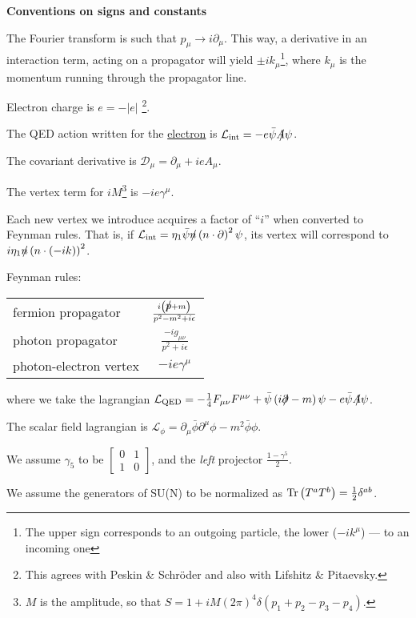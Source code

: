 \documentclass[14pt]{article}
\newcommand{\slashed}[1]{\hbox{{$#1$}\llap{$/$}}}
\begin{document}
\renewcommand{\thefootnote}{\fnsymbol{footnote}}

\begin{center}
	{\Large\bf Conventions on signs and constants}
\end{center}

\bigskip

	The Fourier transform is such that
$ p_\mu \to i \partial_\mu $. 
	This way, a derivative in an
	interaction term, acting on a propagator will yield
$ \pm i k_\mu $\footnote[2]{The upper sign corresponds to an outgoing
particle, the lower ($ - i k^\mu $) --- to an incoming one},
	where
$ k_\mu $
	is the momentum running through the propagator line.

	Electron charge is 
$ e = - |e| $ \footnote[3]{This agrees with Peskin \& Schr\"oder and also
with Lifshitz \& Pitaevsky.}.

	The QED action written for the \underline{electron} is
$ \mathcal{L}_{\rm int} = -e\bar{\psi}\slashed{A}\psi $.

	The covariant derivative is 
$ \mathcal{D}_\mu = \partial_\mu + i e A_\mu $.

	The vertex term for 
$ i M $\footnote[8]{ 
$ M $ is the amplitude, so that 
$ S = 1 + i M (2\pi)^4 \delta \left(p_1 + p_2 - p_3 - p_4\right) $.}
	is 
$ - i e \gamma^\mu $.

	Each new vertex we introduce acquires a factor of 
``$ i $''
	when converted to Feynman rules. That is, if
$ \mathcal{L}_{\rm int} = \eta_1 \bar\psi \slashed{n} 
	\left(n\cdot\partial\right)^2 \psi $,
	its vertex will correspond to
$ i\eta_1 \slashed{n} \left ( n \cdot (-i k)\right)^2 $.

\bigskip
	Feynman rules:
\renewcommand{\arraystretch}{2.3}
\begin{tabular}{lc}
	fermion propagator &
$ \frac{i\left(\slashed{p} + m \right)}{p^2 - m^2 + i\epsilon} $ \\

	photon propagator &
$ \frac{-i g_{\mu\nu}}{p^2 + i\epsilon} $ \\

	photon-electron vertex & 
$ -i e \gamma^\mu $ \\
\end{tabular}

\bigskip
	where we take the lagrangian
$ \mathcal{L}_{\rm QED} = - \frac{1}{4} F_{\mu\nu}F^{\mu\nu} +
		\bar{\psi}\left( i \slashed{\partial} - m \right)\psi -
		e\bar{\psi}\slashed{A}\psi $.

	The scalar field lagrangian is
$ \mathcal{L}_{\phi} = \partial_\mu \bar{\phi} \partial^\mu \phi -
			m^2 \bar{\phi} \phi $.

\renewcommand{\arraystretch}{1.0}
	We assume $\gamma_5$ to be 
$\left[\begin{array}{cc}
      0  & 1 \\
      1  & 0
\end{array}\right]$, and the {\it left} projector
$\frac{1 - \gamma^5}{2}$.

	We assume the generators of SU(N) to be normalized as
$ {\rm Tr}\left(T^a T^b\right) = \frac{1}{2} \delta^{ab} $.
\end{document}
